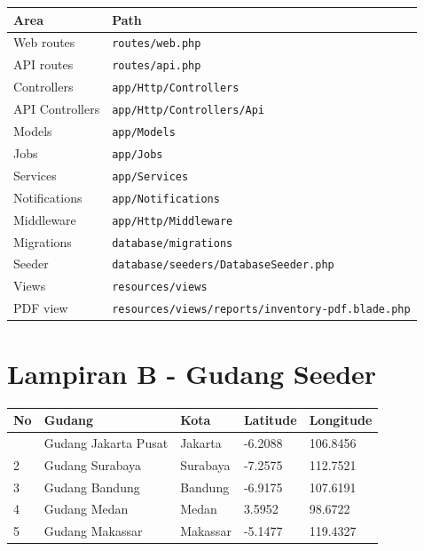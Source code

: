 \documentclass[
]{article}
\begin{document}
\begin{longtable}[]{@{}P{0.26\textwidth}P{0.70\textwidth}@{}}
\toprule\noalign{}
Area & Path \\
\midrule\noalign{}
\endhead
\bottomrule\noalign{}
\endlastfoot
Web routes & \texttt{routes/web.php} \\
API routes & \texttt{routes/api.php} \\
Controllers & \texttt{app/Http/Controllers} \\
API Controllers & \texttt{app/Http/Controllers/Api} \\
Models & \texttt{app/Models} \\
Jobs & \texttt{app/Jobs} \\
Services & \texttt{app/Services} \\
Notifications & \texttt{app/Notifications} \\
Middleware & \texttt{app/Http/Middleware} \\
Migrations & \texttt{database/migrations} \\
Seeder & \texttt{database/seeders/DatabaseSeeder.php} \\
Views & \texttt{resources/views} \\
PDF view & \texttt{resources/views/reports/inventory-pdf.blade.php} \\
\end{longtable}

\section{Lampiran B - Gudang Seeder}\label{lampiran-b---gudang-seeder}

\begin{longtable}[]{@{}P{0.10\textwidth}P{0.26\textwidth}P{0.22\textwidth}C{0.12\textwidth}C{0.12\textwidth}@{}}
\toprule\noalign{}
No & Gudang & Kota & Latitude & Longitude \\
\midrule\noalign{}
\endhead
\bottomrule\noalign{}
 & Gudang Jakarta Pusat & Jakarta & -6.2088 & 106.8456 \\
2 & Gudang Surabaya & Surabaya & -7.2575 & 112.7521 \\
3 & Gudang Bandung & Bandung & -6.9175 & 107.6191 \\
4 & Gudang Medan & Medan & 3.5952 & 98.6722 \\
5 & Gudang Makassar & Makassar & -5.1477 & 119.4327 \\
\end{longtable}
\end{document}
